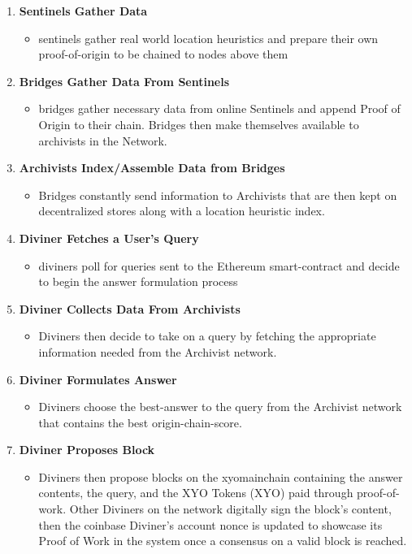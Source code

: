\documentclass{article}
\begin{document}
\begin{enumerate}
  \item \textbf{Sentinels Gather Data}
  \begin{itemize}
    \item \Glspl{sentinel} gather real world location heuristics and prepare their own \Gls{proof-of-origin} to be chained to nodes above them
  \end{itemize}
  \item \textbf{Bridges Gather Data From Sentinels}
  \begin{itemize}
    \item \Glspl{bridge} gather necessary data from online Sentinels and append Proof of Origin to their chain. Bridges then make themselves available to \Glspl{archivist} in the Network.
  \end{itemize}
  \item \textbf{Archivists Index/Assemble Data from Bridges}
  \begin{itemize}
    \item Bridges constantly send information to Archivists that are then kept on decentralized stores along with a location \gls{heuristic} index.
  \end{itemize}
  \item \textbf{Diviner Fetches a User's Query}
  \begin{itemize}
    \item \Glspl{diviner} poll for queries sent to the Ethereum \gls{smart-contract} and decide to begin the answer formulation process
  \end{itemize}
  \item \textbf{Diviner Collects Data From Archivists}
  \begin{itemize}
    \item  Diviners then decide to take on a query by fetching the appropriate information needed from the Archivist network.
  \end{itemize}
  \item \textbf{Diviner Formulates Answer}
  \begin{itemize}
    \item Diviners choose the \Gls{best-answer} to the query from the Archivist network that contains the best \Gls{origin-chain-score}.
  \end{itemize}
  \item \textbf{Diviner Proposes Block}
  \begin{itemize}
    \item Diviners then propose blocks on the \Gls{xyomainchain} containing the answer contents, the query, and the XYO Tokens (XYO) paid through \Gls{proof-of-work}. Other Diviners on the network digitally sign the block's content, then the coinbase Diviner's account nonce is updated to showcase its Proof of Work in the system once a consensus on a valid block is reached.

\end{itemize}
\end{enumerate}
\end{document}
